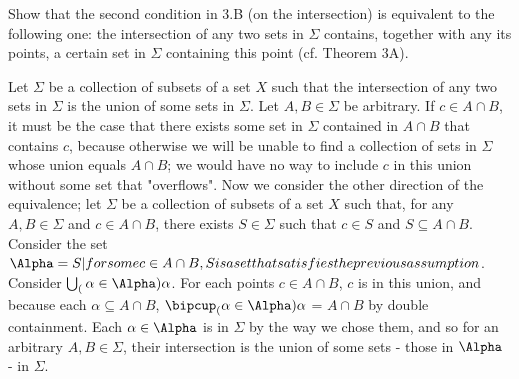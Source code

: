 \begin{majorEx}%
Show that the second condition in 3.B (on the intersection) is equivalent to the following one: the intersection of any two sets in $\Sigma$ contains, together with any its points, a certain set in $\Sigma$ containing this point (cf. Theorem 3A).
\end{majorEx}
Let $\Sigma$ be a collection of subsets of a set $X$ such that the intersection of any two sets in $\Sigma$ is the union of some sets in $\Sigma$. Let $A, B \in \Sigma$ be arbitrary. If $c \in A \cap B$, it must be the case that there exists some set in $\Sigma$ contained in $A \cap B$ that contains $c$, because otherwise we will be unable to find a collection of sets in $\Sigma$ whose union equals $A \cap B$; we would have no way to include $c$ in this union without some set that "overflows".
Now we consider the other direction of the equivalence; let $\Sigma$ be a collection of subsets of a set $X$ such that, for any $A, B \in \Sigma$ and $c \in A \cap B$, there exists $S \in \Sigma$ such that $c \in S$ and $S \subseteq A \cap B$. Consider the set $\Alpha = {S | for some c \in A \cap B, S is a set that satisfies the previous assumption}$. Consider $\bigcup_(\alpha \in \Alpha) \alpha$. For each points $c \in A \cap B$, $c$ is in this union, and because each $\alpha \subseteq A \cap B$, $\bipcup_(\alpha \in \Alpha) \alpha$ = $A \cap B$ by double containment. Each $\alpha \in \Alpha$ is in $\Sigma$ by the way we chose them, and so for an arbitrary $A, B \in \Sigma$, their intersection is the union of some sets - those in $\Alpha$ - in $\Sigma$.

